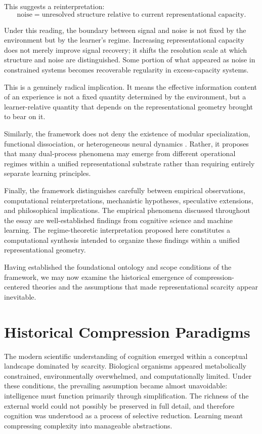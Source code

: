 \documentclass[12pt,a4paper]{article}
\begin{document}
This suggests a reinterpretation:
\[
\text{noise} = \text{unresolved structure relative to current representational capacity}.
\]

Under this reading, the boundary between signal and noise is not fixed by the environment but by the learner's regime. Increasing representational capacity does not merely improve signal recovery; it shifts the resolution scale at which structure and noise are distinguished. Some portion of what appeared as noise in constrained systems becomes recoverable regularity in excess-capacity systems.

This is a genuinely radical implication. It means the effective information content of an experience is not a fixed quantity determined by the environment, but a learner-relative quantity that depends on the representational geometry brought to bear on it.

Similarly, the framework does not deny the existence of modular specialization, functional dissociation, or heterogeneous neural dynamics \cite{SherrySchacter1987}. Rather, it proposes that many dual-process phenomena may emerge from different operational regimes within a unified representational substrate rather than requiring entirely separate learning principles.

Finally, the framework distinguishes carefully between empirical observations, computational reinterpretations, mechanistic hypotheses, speculative extensions, and philosophical implications. The empirical phenomena discussed throughout the essay are well-established findings from cognitive science and machine learning. The regime-theoretic interpretation proposed here constitutes a computational synthesis intended to organize these findings within a unified representational geometry.

Having established the foundational ontology and scope conditions of the framework, we may now examine the historical emergence of compression-centered theories and the assumptions that made representational scarcity appear inevitable.


\section{Historical Compression Paradigms}

The modern scientific understanding of cognition emerged within a conceptual landscape dominated by scarcity. Biological organisms appeared metabolically constrained, environmentally overwhelmed, and computationally limited. Under these conditions, the prevailing assumption became almost unavoidable: intelligence must function primarily through simplification. The richness of the external world could not possibly be preserved in full detail, and therefore cognition was understood as a process of selective reduction. Learning meant compressing complexity into manageable abstractions.
\end{document}
